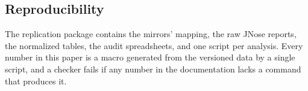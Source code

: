 \subsection{Reproducibility}
\label{sec:reproducibility}

The replication package contains the mirrors' mapping, the raw JNose reports, the
normalized tables, the audit spreadsheets, and one script per analysis. Every number in
this paper is a macro generated from the versioned data by a single script, and a checker
fails if any number in the documentation lacks a command that produces it.
